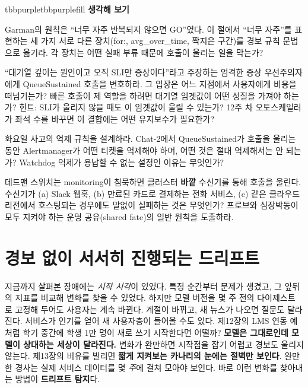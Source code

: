 \begin{calloutbox}{tbbpurple}{tbbpurplefill}
{\normalsize\bfseries\color{tbbpurple}생각해 보기}\par\vspace{3pt}
\begin{tbbitemize}
  \item Garman의 원칙은 “너무 자주 반복되지 않으면 GO”였다. 이 절에서 “너무 자주”를 표현하는 세 가지 서로 다른 장치(for:, avg\_over\_time, 짝지은 구간)를 경보 규칙 문법으로 옮기라. 각 장치는 어떤 실패 부류 때문에 호출이 울리는 일을 막는가?
  \item “대기열 깊이는 원인이고 오직 SLI만 증상이다”라고 주장하는 엄격한 증상 우선주의자에게 QueueSustained 호출을 변호하라. 그 입장은 어느 지점에서 사용자에게 비용을 떠넘기는가? 빠른 호출이 제 역할을 하려면 대기열 임곗값이 어떤 성질을 가져야 하는가? 힌트: SLI가 울리지 않을 때도 이 임곗값이 울릴 수 있는가? 12주 차 오토스케일러가 좌석 수를 바꾸면 이 결합에는 어떤 유지보수가 필요한가?
  \item 화요일 사고의 억제 규칙을 설계하라. Chat-2에서 QueueSustained가 호출을 울리는 동안 Alertmanager가 어떤 티켓을 억제해야 하며, 어떤 것은 절대 억제해서는 안 되는가? Watchdog 억제가 용납할 수 없는 설정인 이유는 무엇인가?
  \item 데드맨 스위치는 monitoring이 침묵하면 클러스터 \textbf{바깥} 수신기를 통해 호출을 울린다. 수신기가 (a) Slack 웹훅, (b) 만료된 카드로 결제하는 전화 서비스, (c) 같은 클라우드 리전에서 호스팅되는 경우에도 말없이 실패하는 것은 무엇인가? 프로브와 심장박동이 모두 지켜야 하는 운명 공유(shared fate)의 일반 원칙을 도출하라.
\end{tbbitemize}
\end{calloutbox}

\section{경보 없이 서서히 진행되는 드리프트}

지금까지 살펴본 장애에는 \textit{시작 시각}이 있었다. 특정 순간부터 문제가 생겼고, 그 앞뒤의 지표를 비교해 변화를 찾을 수 있었다. 하지만 모델 버전을 몇 주 전의 다이제스트 로 고정해 두어도 사용자는 계속 바뀐다. 계절이 바뀌고, 새 뉴스가 나오면 질문도 달라진다. 서비스가 인기를 얻어 새 사용자층이 들어올 수도 있다. 제12장의 LMS 연동 예처럼 학기 중간에 학생 1만 명이 새로 쓰기 시작한다면 어떨까? \textbf{모델은 그대로인데 모델이 상대하는 세상이 달라진다.} 변화가 완만하면 시작점을 잡기 어렵고 경보도 울리지 않는다. 제13장의 비유를 빌리면 \textbf{짧게 지켜보는 카나리의 눈에는 절벽만 보인다}. 완만한 경사는 실제 서비스 데이터를 몇 \textit{주}에 걸쳐 모아야 보인다. 바로 이런 변화를 찾아내는 방법이 \textbf{드리프트 탐지}다.

